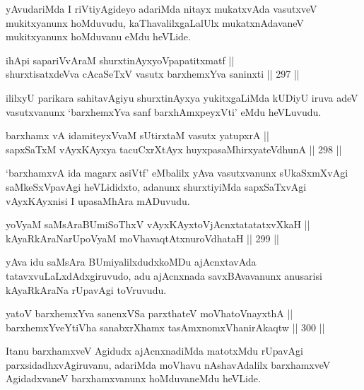 \begin{artha}
yAvudariMda I riVtiyAgideyo adariMda nitayx mukatxvAda vasutxveV
mukitxyanunx hoMduvudu, kaThavalilxgaLalUlx mukatxnAdavaneV mukitxyanunx hoMduvanu eMdu heVLide.
\end{artha}

\begin{shl}
ihApi sapariVvAraM shurxtinAyxyoVpapatitxmatf || \\
shurxtisatxdeVva cA\s \s caSeTxV vasutx barxhemxYva saninxti ||  297 ||  
\end{shl}

\begin{artha}
ililxyU parikara sahitavAgiyu shurxtinAyxya yukitxgaLiMda kUDiyU iruva
adeV vasutxvanunx `barxhemxYva sanf barxhAmxpeyxVti' eMdu heVLuvudu.
\end{artha}

\begin{shl}
barxhamx vA idamiteyxVvaM sUtirxtaM vasutx yatupxrA || \\
sapxSaTxM vAyxKAyxya tacuCxrXtAyx huyxpasaMhirxyateV\s dhunA ||  298 ||  
\end{shl}

\begin{artha}
`barxhamxvA ida magarx asiVtf' eMbalilx yAva vasutxvanunx sUkaSxmXvAgi
saMkeSxVpavAgi heVLididxto, adanunx shurxtiyiMda sapxSaTxvAgi
vAyxKAyxnisi I upasaMhAra mADuvudu.
\end{artha}


\begin{shl}
yoV\s yaM saMsAraBUmiSoThxV vAyxKAyxtoV\s jAcnxtatatatxvXkaH || \\
kAyaRkAraNarUpoV\s yaM moVhavaqtAtxnuroVdhataH ||  299 ||  
\end{shl}

\begin{artha}
yAva idu saMsAra BUmiyalilxdudxkoMDu ajAcnxtavAda
tatavxvuLaLxdAdxgiruvudo, adu ajAcnxnada savxBAvavanunx anusarisi
kAyaRkAraNa rUpavAgi toVruvudu.
\end{artha}

\begin{shl}
yatoV barxhemxYva sanenxVSa parxthateV moVhatoV\s nayxthA || \\
barxhemxYveYtiVha sanabxrXhamx tasAmxnomxVhanirAkaqtw ||  300 ||  
\end{shl}

\begin{artha}
Itanu barxhamxveV Agidudx ajAcnxnadiMda matotxMdu rUpavAgi
parxsidadhxvAgiruvanu, adariMda moVhavu nAshavAdalilx barxhamxveV
AgidadxvaneV barxhamxvanunx hoMduvaneMdu heVLide.
\end{artha}

